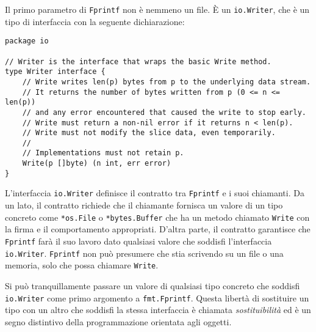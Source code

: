 \documentclass[../../thesis.tex]{subfiles}
\begin{document}
    Il primo parametro di \verb"Fprintf" non è nemmeno un file.
    È un \verb"io.Writer", che è un tipo di interfaccia con la seguente dichiarazione:
    \begin{lstlisting}[frame = single, label = {lst:lstlisting6-1.2}]
package io

// Writer is the interface that wraps the basic Write method.
type Writer interface {
    // Write writes len(p) bytes from p to the underlying data stream.
    // It returns the number of bytes written from p (0 <= n <= len(p))
    // and any error encountered that caused the write to stop early.
    // Write must return a non-nil error if it returns n < len(p).
    // Write must not modify the slice data, even temporarily.
    //
    // Implementations must not retain p.
    Write(p []byte) (n int, err error)
}
    \end{lstlisting}
    L'interfaccia \verb"io.Writer" definisce il contratto tra \verb"Fprintf" e i suoi chiamanti.
    Da un lato, il contratto richiede che il chiamante fornisca un valore di un tipo concreto come \verb"*os.File" o \verb"*bytes.Buffer" che ha un metodo chiamato \verb"Write" con la firma e il comportamento appropriati.
    D'altra parte, il contratto garantisce che \verb"Fprintf" farà il suo lavoro dato qualsiasi valore che soddisfi l'interfaccia \verb"io.Writer". \verb"Fprintf" non può presumere che stia scrivendo su un file o una memoria, solo che possa chiamare \verb"Write".
    \hfill \vspace{12pt}

    Si può tranquillamente passare un valore di qualsiasi tipo concreto che soddisfi \verb"io.Writer" come primo argomento a \verb"fmt.Fprintf".
    Questa libertà di sostituire un tipo con un altro che soddisfi la stessa interfaccia è chiamata \textit{sostituibilità} ed è un segno distintivo della programmazione orientata agli oggetti.
    \hfill \vspace{12pt}
\end{document}
